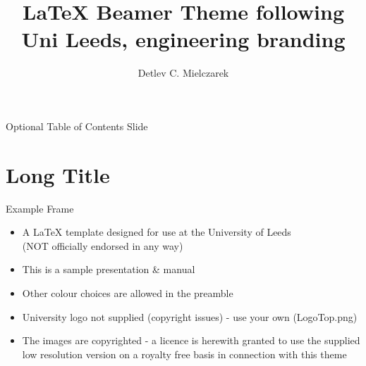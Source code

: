 \documentclass[aspectratio=43,display]{beamer}
\title[Beamer Theme]{LaTeX Beamer Theme following Uni Leeds, engineering branding}
\author[DCM] %
{%
	Detlev C. Mielczarek\inst{1}
}
\institute[UL]{\inst{1}Your Institution Here}
\begin{document}
\maketitle



\begin{frame}{Optional Table of Contents Slide}
	\tableofcontents
\end{frame}

\section[Short Title]{Long Title}

\begin{frame}{Example Frame}
\begin{itemize}[<1->]
	
	\item A LaTeX template designed for use at the University of Leeds \\ (NOT officially endorsed in any way)
	
	\item This is a sample presentation \& manual
	
	\item Other colour choices are allowed in the preamble
	
	\item University logo not supplied (copyright issues) - use your own (LogoTop.png)
	
	\item The images are copyrighted - a licence is herewith granted to use the supplied low resolution version on a royalty free basis in connection with this theme
\end{itemize}
\end{frame}
\end{document}
